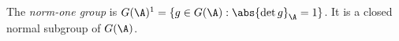 The \emph{norm-one group} is $G(\A)^1=\{g\in G(\A):\abs{\det g}_\A=1\}$. It is a closed normal subgroup of $G(\A)$.
